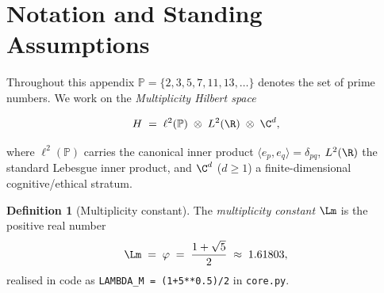 \documentclass[12pt,a4paper]{article}
\theoremstyle{plain}
\theoremstyle{definition}
\newtheorem{definition}[theorem]{Definition}
\newcommand{\PP}{\mathbb{P}}
\begin{document}
\begin{abstract}
  \noindent
  This appendix provides complete proofs and operator norm bounds for the core
  mathematical objects of the 13+1 Strata Multiplicity Framework (Multiplicity
  Theory / ORF).  The principal results are:
  (i)~boundedness and self-adjointness of the Universal Spectral Operator
  $\USO = A + B + E$ on the prime-indexed Hilbert space
  $H = \ell^2(\PP)\otimes L^2(\R)\otimes\C^d$;
  (ii)~existence and uniqueness of the lawful fixed-point subspace
  $\Hlaw = \Ran(\Pcsl\circ\Pfix)$ via the Banach--Alaoglu and
  Browder--Kirk theorems;
  (iii)~a certified contraction bound $\hat\lambda < 1$ for the
  descending-limb Jensen--Shannon error metric under realistic EEG
  perturbation;
  (iv)~the Ward residual boundary $W(t) < 0.05$ as a sharp threshold
  in the ethics--certify two-threshold architecture;
  (v)~a pseudo-integration detection lemma formalising the 13th
  bifurcation gate;
  and
  (vi)~a stability conjecture connecting local Lipschitz contraction
  per stratum to global bounded cross-stratum coherence.
  All results are grounded in the committed PhaseMirror-HQ codebase
  (\texttt{core.py}, \texttt{ethics.py}, \texttt{certify.py},
  \texttt{constitutional\_field.py}).
\end{abstract}

\vspace{0.8em}
\tableofcontents
\newpage

\section{Notation and Standing Assumptions}
\label{sec:notation}

Throughout this appendix $\PP = \{2,3,5,7,11,13,\ldots\}$ denotes the set of
prime numbers.  We work on the \emph{Multiplicity Hilbert space}

\begin{equation}
  H \;=\; \ell^2(\PP)\;\otimes\;L^2(\R)\;\otimes\;\C^d,
  \label{eq:hilbert}
\end{equation}

where $\ell^2(\PP)$ carries the canonical inner product
$\langle e_p, e_q\rangle = \delta_{pq}$, $L^2(\R)$ the standard
Lebesgue inner product, and $\C^d$ ($d\ge1$) a finite-dimensional
cognitive/ethical stratum.

\begin{definition}[Multiplicity constant]
  The \emph{multiplicity constant} $\Lm$ is the positive real number
  \[
    \Lm \;=\; \varphi \;=\; \frac{1+\sqrt{5}}{2} \;\approx\; 1.61803,
  \]
  realised in code as \texttt{LAMBDA\_M = (1+5**0.5)/2} in
  \texttt{core.py}.
\end{definition}
\end{document}
